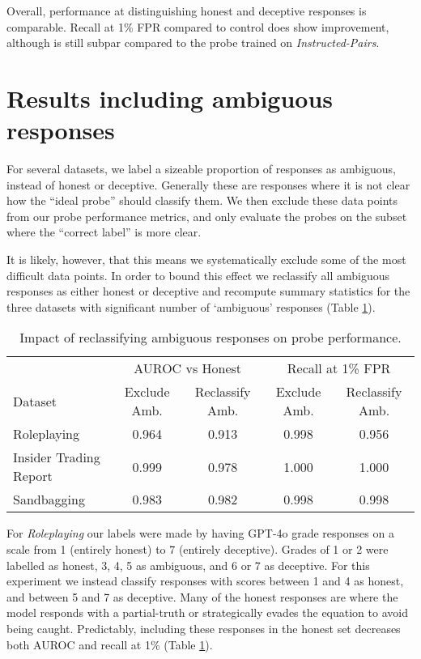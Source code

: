 \documentclass{article}
\begin{document}
Overall, performance at distinguishing honest and deceptive responses is comparable. Recall at 1\% FPR compared to control does show improvement, although is still subpar compared to the probe trained on \textit{Instructed-Pairs}.

\section{Results including ambiguous responses}
\label{appx:include-ambiguous}
For several datasets, we label a sizeable proportion of responses as ambiguous, instead of honest or deceptive.
Generally these are responses where it is not clear how the \enquote{ideal probe} should classify them.
We then exclude these data points from our probe performance metrics, and only evaluate the probes on the subset where the \enquote{correct label} is more clear.

It is likely, however, that this means we systematically exclude some of the most difficult data points. In order to
 bound this effect we reclassify all ambiguous responses as either
honest or deceptive and recompute summary statistics for the three datasets with significant number of `ambiguous' responses (Table \ref{tab:ambiguous_results}).

\begin{table}[h]
\centering
\caption{Impact of reclassifying ambiguous responses on probe performance.}
\begin{tabular}{lcccc}
\toprule
& \multicolumn{2}{c}{AUROC vs Honest} & \multicolumn{2}{c}{Recall at 1\% FPR} \\
Dataset & Exclude Amb. & Reclassify Amb. &  Exclude Amb. & Reclassify Amb.\\
\midrule
Roleplaying & 0.964 & 0.913 & 0.998 & 0.956 \\
Insider Trading Report & 0.999 & 0.978 & 1.000 & 1.000 \\
Sandbagging & 0.983 & 0.982 & 0.998 & 0.998 \\
\bottomrule
\end{tabular}
\label{tab:ambiguous_results}
\end{table}


For \emph{Roleplaying} our labels were made by having GPT-4o grade responses on a scale from 1 (entirely honest) to 7 (entirely deceptive). Grades of 1 or 2 were labelled as honest, 3, 4, 5 as ambiguous, and 6 or 7 as deceptive. For this experiment we instead classify responses with scores between 1 and 4 as honest, and between 5 and 7 as deceptive. Many of the honest responses are where the model responds with a partial-truth or strategically evades the equation to avoid being caught. Predictably, including these responses in the honest set decreases both AUROC and recall at 1\% (Table \ref{tab:ambiguous_results}).
\end{document}
